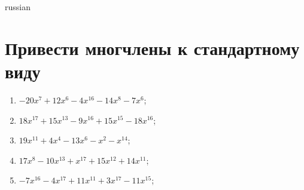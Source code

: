 \documentclass[a4paper]{article}
\begin{document}
\begin{otherlanguage*}{russian}

\section{Привести многчлены к стандартному виду}
\begin{enumerate}
\item $-20x^7 + 12x^6 - 4x^16 - 14x^8 - 7x^6$;
\item $18x^17 + 15x^13 - 9x^16 + 15x^15 - 18x^16$;
\item $19x^11 + 4x^4 - 13x^6 - x^2 - x^14$;
\item $17x^8 - 10x^13 + x^17 + 15x^12 + 14x^11$;
\item $-7x^16 - 4x^17 + 11x^11 + 3x^17 - 11x^15$;
\end{enumerate}
\end{otherlanguage*}
\end{document}
